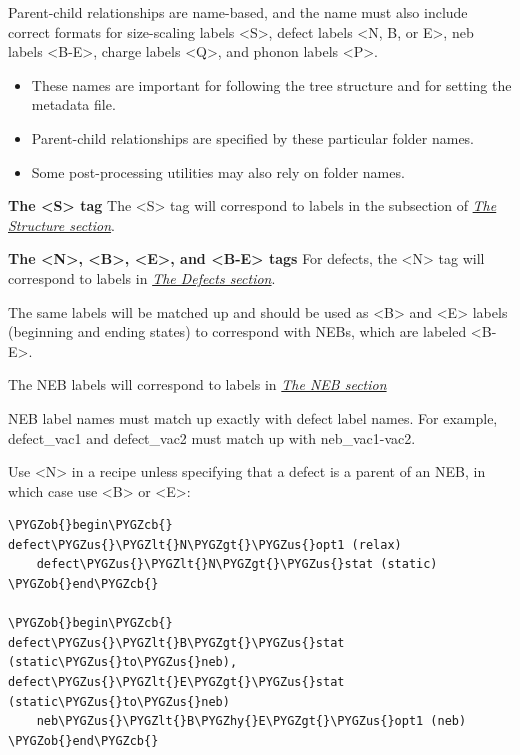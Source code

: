 \documentclass[letterpaper,10pt,english]{sphinxmanual}
\def\PYGZus{\char`\_}
\def\PYGZob{\char`\{}
\def\PYGZcb{\char`\}}
\def\PYGZlt{\char`\<}
\def\PYGZgt{\char`\>}
\def\PYGZhy{\char`\-}
\begin{document}
Parent-child relationships are name-based, and the name must also include correct formats for size-scaling labels \textless{}S\textgreater{}, defect labels \textless{}N, B, or E\textgreater{}, neb labels \textless{}B-E\textgreater{}, charge labels \textless{}Q\textgreater{}, and phonon labels \textless{}P\textgreater{}.
\begin{itemize}
\item {} 
These names are important for following the tree structure and for setting the metadata file.

\item {} 
Parent-child relationships are specified by these particular folder names.

\item {} 
Some post-processing utilities may also rely on folder names.

\end{itemize}

\textbf{The \textless{}S\textgreater{} tag}
The \textless{}S\textgreater{} tag will correspond to labels in the  subsection of {\hyperref[3_1_1_structure::doc]{\emph{The Structure section}}}.

\textbf{The \textless{}N\textgreater{}, \textless{}B\textgreater{}, \textless{}E\textgreater{}, and \textless{}B-E\textgreater{} tags}
For defects, the \textless{}N\textgreater{} tag will correspond to labels in {\hyperref[3_1_5_defects::doc]{\emph{The Defects section}}}.

The same labels will be matched up and should be used as \textless{}B\textgreater{} and \textless{}E\textgreater{} labels (beginning and ending states) to correspond with NEBs, which are labeled \textless{}B-E\textgreater{}.

The NEB labels will correspond to labels in {\hyperref[3_1_6_neb::doc]{\emph{The NEB section}}}

NEB label names must match up exactly with defect label names. For example, defect\_vac1 and defect\_vac2 must match up with neb\_vac1-vac2.

Use \textless{}N\textgreater{} in a recipe unless specifying that a defect is a parent of an NEB, in which case use \textless{}B\textgreater{} or \textless{}E\textgreater{}:

\begin{Verbatim}[commandchars=\\\{\}]
\PYGZob{}begin\PYGZcb{}
defect\PYGZus{}\PYGZlt{}N\PYGZgt{}\PYGZus{}opt1 (relax)
    defect\PYGZus{}\PYGZlt{}N\PYGZgt{}\PYGZus{}stat (static)
\PYGZob{}end\PYGZcb{}

\PYGZob{}begin\PYGZcb{}
defect\PYGZus{}\PYGZlt{}B\PYGZgt{}\PYGZus{}stat (static\PYGZus{}to\PYGZus{}neb), defect\PYGZus{}\PYGZlt{}E\PYGZgt{}\PYGZus{}stat (static\PYGZus{}to\PYGZus{}neb)
    neb\PYGZus{}\PYGZlt{}B\PYGZhy{}E\PYGZgt{}\PYGZus{}opt1 (neb)
\PYGZob{}end\PYGZcb{}
\end{Verbatim}
\end{document}
